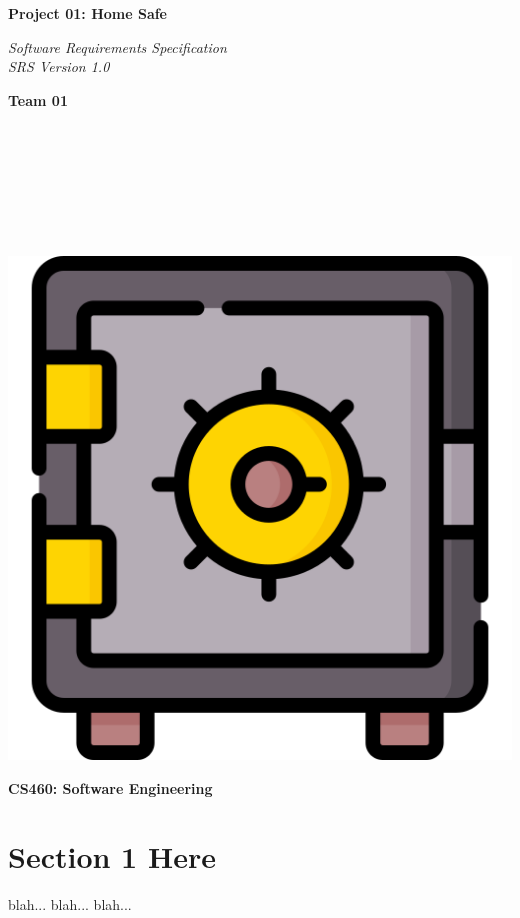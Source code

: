 \documentclass{article}
\begin{document}
\begin{titlepage}
\begin{center}
\vspace*{1cm}

\Huge
\textbf{Project 01: Home Safe}

\vspace{0.5cm}
\Large
\textit{Software Requirements Specification} \\
\textit{SRS Version 1.0}

\vspace{1cm}

\textbf{Team 01}

\vspace{0.5cm}

 \\
 \\
 \\
 \\
 \\
 \\

\vspace{1cm}

\includegraphics[scale=0.25]{docs/figs/safe.png}\\[0.5cm]

\vspace{3.5cm}

\Large
\textbf{CS460: Software Engineering} \\

\end{center}
\end{titlepage}

\newpage

\tableofcontents

\newpage

\section{Section 1 Here}
blah... blah... blah...
\end{document}
